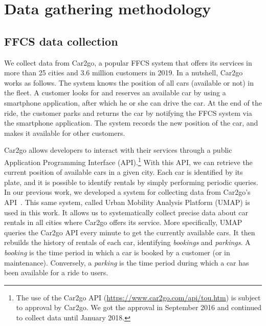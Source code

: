\section{Data gathering methodology}
\label{sec:data_collection}


\subsection{FFCS data collection}

We collect data from Car2go, a popular FFCS system that offers its services in more than 25 cities and 3.6 million customers in 2019.
In a nutshell, Car2go works as follows. The system knows the position of all cars (available or not) in the fleet. A customer looks for and reserves an available car by using a smartphone application, after which he or she can drive the car. At the end of the ride, the customer parks and returns the car by notifying the FFCS system via the smartphone application. The system records the new position of the car, and makes it available for other customers.

Car2go allows developers to interact with their services through a public Application Programming Interface (API).\footnote{The use of the Car2go API (\url{https://www.car2go.com/api/tou.htm}) is subject to approval by Car2go. We got the approval in September 2016 and  continued to collect data until January 2018.}
With this API, we can retrieve the current position of available cars in a given city. Each car is identified by its plate, and it is possible to identify rentals by simply performing periodic queries. In our previous work, we developed a system for collecting data from Car2go's API~\citep{UMAP}.
This same system, called Urban Mobility Analysis Platform (UMAP) is used in this work. It allows us to systematically collect precise data about car rentals in all cities where Car2go offers its service.
More specifically, UMAP queries the Car2go API every minute to get the currently available cars. It then rebuilds the history of rentals of each car, identifying \textit{bookings} and \textit{parkings}. A \textit{booking} is the time period in which a car is booked by a customer (or in maintenance). Conversely, a \textit{parking} is the time period during which a car has been available for a ride to users.  

